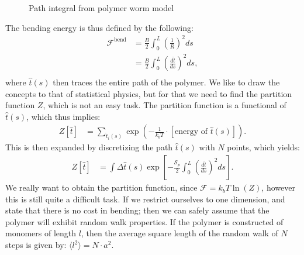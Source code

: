 \documentclass[a4paper]{article}
\newcommand{\f}{\mathcal{F}}
\begin{document}
\vspace*{0.5cm}\noindent
\begin{figure}[H]
    \centering
    \label{fig: polymer worm model}
    \caption{Path integral from polymer worm model}
\end{figure}\noindent
The bending energy is thus defined by the following:
\begin{align*}
    \f^{\text{bend}} &= \frac{B}{2}\int_0^L \left(\frac{1}{R}\right)^2ds\\
    &= \frac{B}{2}\int_0^L \left(\frac{d\hat{t}}{ds}\right)^2ds,\\
\end{align*}where $\hat{t}(s)$ then traces the entire path of the polymer. We like to draw the concepts to that of statistical physics, but for that we need to find the partition function $Z$, which is not an easy task.
The partition function is a functional of $\hat{t}(s)$, which thus implies:
\begin{align*}
    Z[\hat{t}] &= \sum_{\hat{t}_i(s)} \exp\left(-\frac{1}{k_bT}\cdot\left[\text{energy of }\hat{t}(s)\right]\right).
\end{align*}This is then expanded by discretizing the path $\hat{t}(s)$ with $N$ points, which yields:
\begin{align*}
    Z[\hat{t}] &=\int \Delta\hat{t}(s)\exp\left[-\frac{\mathcal{S}_p}{2}\int_0^L\left(\frac{d\hat{t}}{ds}\right)^2ds\right].
\end{align*}We really want to obtain the partition function, since $\f = k_bT\ln(Z)$, however this is still quite a difficult task.
If we restrict ourselves to one dimension, and state that there is no cost in bending; then we can safely assume that the polymer will exhibit random walk properties.
If the polymer is constructed of monomers of length $l$, then the average square length of the random walk of $N$ steps is given by: $\langle l^2\rangle = N \cdot a^2$.
\end{document}
